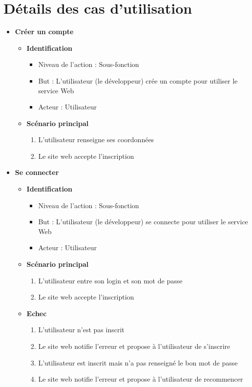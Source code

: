 \documentclass[12pt,a4paper]{article}
\begin{document}
\section{Détails des cas d'utilisation}
\begin{itemize}\renewcommand{\labelitemi}{$\bullet$}
  
\item\textbf{\large Créer un compte} 
  \begin{itemize} 
  \item \textbf{Identification} 
    \begin{itemize} 
    \item[] Niveau de l'action : Sous-fonction 
    \item[] But : L'utilisateur (le développeur) crée un compte pour utiliser le service Web 
    \item[] Acteur : Utilisateur 
    \end{itemize} 
  \item \textbf{Scénario principal} 
    \begin{enumerate} 
    \item L'utilisateur renseigne ses coordonnées 
    \item Le site web accepte l'inscription 
    \end{enumerate}
  \end{itemize}
  
\item\textbf{\large Se connecter} 
  \begin{itemize} 
  \item \textbf{Identification} 
    \begin{itemize} 
    \item[] Niveau de l'action : Sous-fonction 
    \item[] But : L'utilisateur (le développeur) se connecte pour utiliser le service Web
    \item[] Acteur : Utilisateur 
    \end{itemize} 
  \item \textbf{Scénario principal} 
    \begin{enumerate} 
    \item L'utilisateur entre son login et son mot de passe 
    \item Le site web accepte l'inscription 
    \end{enumerate} 
  \item \textbf{Echec} 
    \begin{enumerate} 
    \item L'utilisateur n'est pas inscrit 
    \item Le site web notifie l'erreur et propose à l'utilisateur de s'inscrire 
    \item L'utilisateur est inscrit mais n'a pas renseigné le bon mot de passe 
    \item Le site web notifie l'erreur et propose à l'utilisateur de recommencer 
    \end{enumerate} 
  \end{itemize}
  

\end{itemize}
\end{document}
